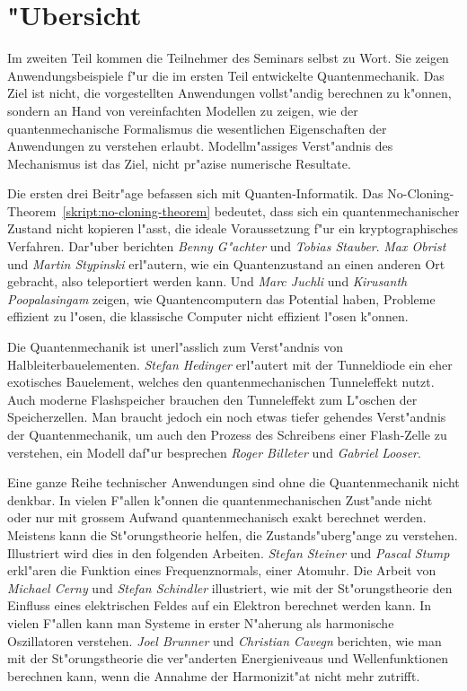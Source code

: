 \chapter*{"Ubersicht}
\rhead{}
\label{skript:uebersicht}
Im zweiten Teil kommen die Teilnehmer des Seminars selbst zu Wort.
Sie zeigen Anwendungsbeispiele f"ur die im ersten
Teil entwickelte Quantenmechanik.
Das Ziel ist nicht, die vorgestellten Anwendungen vollst"andig
berechnen zu k"onnen, sondern an Hand von vereinfachten Modellen
zu zeigen, wie der quantenmechanische Formalismus die wesentlichen
Eigenschaften der Anwendungen zu verstehen erlaubt.
Modellm"assiges Verst"andnis des Mechanismus ist das Ziel, nicht pr"azise
numerische Resultate.

Die ersten drei Beitr"age befassen sich mit Quanten-Informatik.
Das No-Cloning-Theorem~\ref{skript:no-cloning-theorem} bedeutet,
dass sich ein quantenmechanischer
Zustand nicht kopieren l"asst, die ideale Voraussetzung f"ur ein
kryptographisches Verfahren.
Dar"uber berichten {\em Benny G"achter} und {\em Tobias Stauber}.
{\em Max Obrist} und {\em Martin Stypinski} erl"autern, wie ein Quantenzustand
an einen anderen Ort gebracht, also teleportiert werden kann.
Und {\em Marc Juchli} und {\em Kirusanth Poopalasingam} zeigen,
wie Quantencomputern
das Potential haben, Probleme effizient zu l"osen, die klassische 
Computer nicht effizient l"osen k"onnen.

Die Quantenmechanik ist unerl"asslich zum Verst"andnis von
Halbleiterbauelementen.
{\em Stefan Hedinger} erl"autert mit der Tunneldiode
ein eher exotisches Bauelement, welches den quantenmechanischen
Tunneleffekt nutzt.
Auch moderne Flashspeicher brauchen den Tunneleffekt zum L"oschen 
der Speicherzellen.
Man braucht jedoch ein noch etwas tiefer gehendes Verst"andnis der
Quantenmechanik,
um auch den Prozess des Schreibens einer Flash-Zelle zu verstehen, ein
Modell daf"ur besprechen {\em Roger Billeter} und {\em Gabriel Looser}.

Eine ganze Reihe technischer Anwendungen sind ohne die Quantenmechanik
nicht denkbar.
In vielen F"allen k"onnen die quantenmechanischen Zust"ande nicht oder nur
mit grossem Aufwand quantenmechanisch exakt berechnet werden.
Meistens kann die St"orungstheorie helfen, die Zustands"uberg"ange
zu verstehen.
Illustriert wird dies in den folgenden Arbeiten.
{\em Stefan Steiner} und {\em Pascal Stump} erkl"aren die Funktion eines
Frequenznormals, einer Atomuhr. 
Die Arbeit von
{\em Michael Cerny} und {\em Stefan Schindler} illustriert, wie mit der
St"orungstheorie den Einfluss eines elektrischen Feldes auf ein
Elektron berechnet werden kann.
In vielen F"allen kann man Systeme in erster N"aherung als harmonische
Oszillatoren verstehen. {\em Joel Brunner} und {\em Christian Cavegn} berichten,
wie man mit der St"orungstheorie die ver"anderten Energieniveaus und
Wellenfunktionen berechnen kann,
wenn die Annahme der Harmonizit"at nicht mehr zutrifft.

